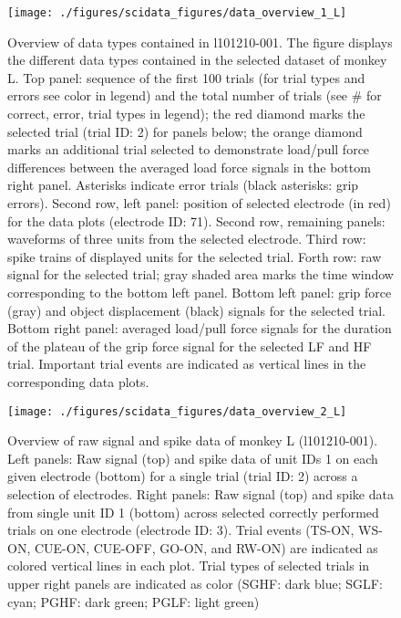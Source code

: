 {\begin{figure}
 \texttt{[image: ./figures/scidata\_figures/data\_overview\_1\_L]}
 \caption[Overview of data types contained in l101210-001]{Overview of data types contained in l101210-001. The figure displays the different data types contained in the selected dataset of monkey L. Top panel: sequence of the first 100 trials (for trial types and errors see color in legend) and the total number of trials (see \# for correct, error, trial types in legend); the red diamond marks the selected trial (trial ID: 2) for panels below; the orange diamond marks an additional trial selected to demonstrate load/pull force differences between the averaged load force signals in the bottom right panel. Asterisks indicate error trials (black asterisks: grip errors). Second row, left panel: position of selected electrode (in red) for the data plots (electrode ID: 71). Second row, remaining panels: waveforms of three units from the selected electrode. Third row: spike trains of displayed units for the selected trial. Forth row: raw signal for the selected trial; gray shaded area marks the time window corresponding to the bottom left panel. Bottom left panel: grip force (gray) and object displacement (black) signals for the selected trial. Bottom right panel: averaged load/pull force signals for the duration of the plateau of the grip force signal for the selected LF and HF trial. Important trial events are indicated as vertical lines in the corresponding data plots.}
 \label{fig:overview_data_lilou_1}
\end{figure}

\begin{figure}
 \texttt{[image: ./figures/scidata\_figures/data\_overview\_2\_L]}
 \caption[Overview of raw signal and spike data of monkey L (l101210-001)]{Overview of raw signal and spike data of monkey L (l101210-001). Left panels: Raw signal (top) and spike data of unit IDs 1 on each given electrode (bottom) for a single trial (trial ID: 2) across a selection of electrodes. Right panels: Raw signal (top) and spike data from single unit ID 1 (bottom) across selected correctly performed trials on one electrode (electrode ID: 3). Trial events (TS-ON, WS-ON, CUE-ON, CUE-OFF, GO-ON, and RW-ON) are indicated as colored vertical lines in each plot. Trial types of selected trials in upper right panels are indicated as color (SGHF: dark blue; SGLF: cyan; PGHF: dark green; PGLF: light green)}
 \label{fig:overview_data_l_2}
\end{figure}

}
